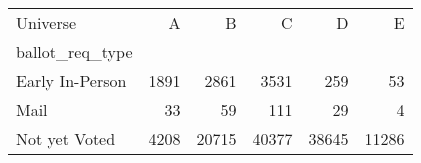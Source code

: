 \begin{tabular}{lrrrrr}
\toprule
Universe & A & B & C & D & E \\
ballot_req_type &  &  &  &  &  \\
\midrule
Early In-Person & 1891 & 2861 & 3531 & 259 & 53 \\
Mail & 33 & 59 & 111 & 29 & 4 \\
Not yet Voted & 4208 & 20715 & 40377 & 38645 & 11286 \\
\bottomrule
\end{tabular}

